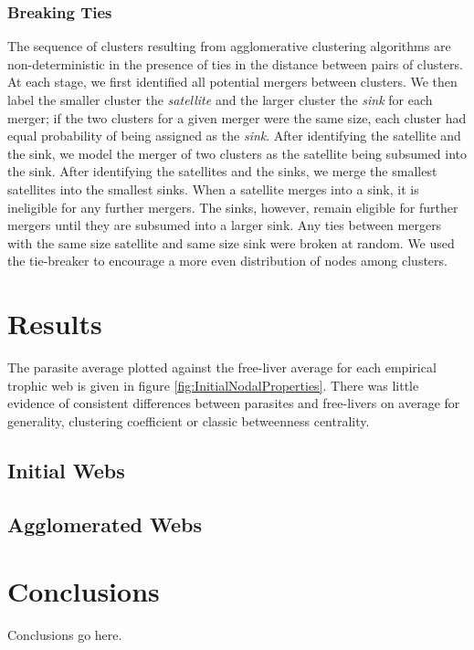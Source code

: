 \documentclass{article}
\begin{document}
\subsubsection{Breaking Ties} The sequence of clusters resulting from
agglomerative clustering algorithms are non-deterministic in the presence of
ties in the distance between pairs of clusters. At each stage, we first
identified all potential mergers between clusters. We then label the smaller
cluster the \textit{satellite} and the larger cluster the \textit{sink} for
each merger; if the two clusters for a given merger were the same size, each
cluster had equal probability of being assigned as the \textit{sink}. After
identifying the satellite and the sink, we model the merger of two clusters as
the satellite being subsumed into the sink. After identifying the satellites
and the sinks, we merge the smallest satellites into the smallest sinks. When a
satellite merges into a sink, it is ineligible for any further mergers. The
sinks, however, remain eligible for further mergers until they are subsumed
into a larger sink. Any ties between mergers with the same size satellite and
same size sink were broken at random. We used the tie-breaker to encourage a
more even distribution of nodes among clusters.  

\section{Results} 
The parasite average plotted against the free-liver average
for each empirical trophic web is given in figure
\ref{fig:InitialNodalProperties}. There was little evidence of consistent
differences between parasites and free-livers on average for generality,
clustering coefficient or classic betweenness centrality. 

\subsection{Initial Webs}

\subsection{Agglomerated Webs}

    
\section{Conclusions} Conclusions go here.
\end{document}
